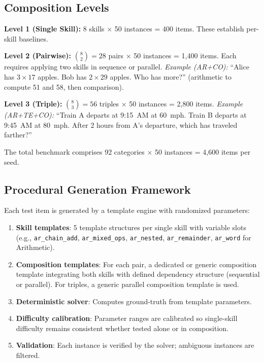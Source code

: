 \documentclass{article}
\begin{document}
\subsection{Composition Levels}

\textbf{Level 1 (Single Skill):} 8 skills $\times$ 50 instances = 400 items. These establish per-skill baselines.

\textbf{Level 2 (Pairwise):} $\binom{8}{2} = 28$ pairs $\times$ 50 instances = 1{,}400 items. Each requires applying two skills in sequence or parallel. \emph{Example (AR+CO):} ``Alice has $3 \times 17$ apples. Bob has $2 \times 29$ apples. Who has more?'' (arithmetic to compute 51 and 58, then comparison).

\textbf{Level 3 (Triple):} $\binom{8}{3} = 56$ triples $\times$ 50 instances = 2{,}800 items. \emph{Example (AR+TE+CO):} ``Train A departs at 9:15~AM at 60~mph. Train B departs at 9:45~AM at 80~mph. After 2 hours from A's departure, which has traveled farther?''

The total benchmark comprises 92 categories $\times$ 50 instances = 4{,}600 items per seed.

\subsection{Procedural Generation Framework}

Each test item is generated by a template engine with randomized parameters:

\begin{enumerate}
    \item \textbf{Skill templates}: 5 template structures per single skill with variable slots (e.g., \texttt{ar\_chain\_add}, \texttt{ar\_mixed\_ops}, \texttt{ar\_nested}, \texttt{ar\_remainder}, \texttt{ar\_word} for Arithmetic).
    \item \textbf{Composition templates}: For each pair, a dedicated or generic composition template integrating both skills with defined dependency structure (sequential or parallel). For triples, a generic parallel composition template is used.
    \item \textbf{Deterministic solver}: Computes ground-truth from template parameters.
    \item \textbf{Difficulty calibration}: Parameter ranges are calibrated so single-skill difficulty remains consistent whether tested alone or in composition.
    \item \textbf{Validation}: Each instance is verified by the solver; ambiguous instances are filtered.
\end{enumerate}
\end{document}

